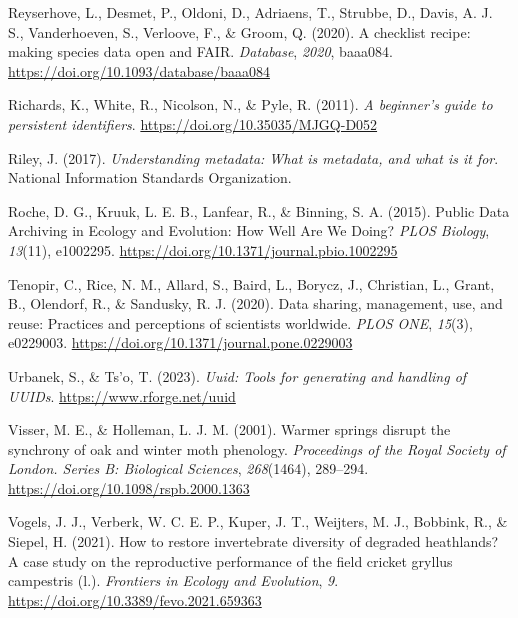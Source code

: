 \documentclass[
]{book}
\newlength{\cslhangindent}
\newlength{\cslentryspacingunit} %
\newenvironment{CSLReferences}[2] %
 {%
  \setlength{\parindent}{0pt}
  \ifodd #1
  \let\oldpar\par
  \def\par{\hangindent=\cslhangindent\oldpar}
  \fi
  \setlength{\parskip}{#2\cslentryspacingunit}
 }%
 {}
\begin{document}
\begin{CSLReferences}{1}{0}
\leavevmode{}%
Reyserhove, L., Desmet, P., Oldoni, D., Adriaens, T., Strubbe, D., Davis, A. J. S., Vanderhoeven, S., Verloove, F., \& Groom, Q. (2020). {A checklist recipe: making species data open and FAIR}. \emph{Database}, \emph{2020}, baaa084. \url{https://doi.org/10.1093/database/baaa084}

\leavevmode{}%
Richards, K., White, R., Nicolson, N., \& Pyle, R. (2011). \emph{A beginner's guide to persistent identifiers}. \url{https://doi.org/10.35035/MJGQ-D052}

\leavevmode{}%
Riley, J. (2017). \emph{Understanding metadata: What is metadata, and what is it for}. National Information Standards Organization.

\leavevmode{}%
Roche, D. G., Kruuk, L. E. B., Lanfear, R., \& Binning, S. A. (2015). Public {Data} {Archiving} in {Ecology} and {Evolution}: {How} {Well} {Are} {We} {Doing}? \emph{PLOS Biology}, \emph{13}(11), e1002295. \url{https://doi.org/10.1371/journal.pbio.1002295}

\leavevmode{}%
Tenopir, C., Rice, N. M., Allard, S., Baird, L., Borycz, J., Christian, L., Grant, B., Olendorf, R., \& Sandusky, R. J. (2020). Data sharing, management, use, and reuse: {Practices} and perceptions of scientists worldwide. \emph{PLOS ONE}, \emph{15}(3), e0229003. \url{https://doi.org/10.1371/journal.pone.0229003}

\leavevmode{}%
Urbanek, S., \& Ts'o, T. (2023). \emph{Uuid: Tools for generating and handling of UUIDs}. \url{https://www.rforge.net/uuid}

\leavevmode{}%
Visser, M. E., \& Holleman, L. J. M. (2001). Warmer springs disrupt the synchrony of oak and winter moth phenology. \emph{Proceedings of the Royal Society of London. Series B: Biological Sciences}, \emph{268}(1464), 289--294. \url{https://doi.org/10.1098/rspb.2000.1363}

\leavevmode{}%
Vogels, J. J., Verberk, W. C. E. P., Kuper, J. T., Weijters, M. J., Bobbink, R., \& Siepel, H. (2021). How to restore invertebrate diversity of degraded heathlands? A case study on the reproductive performance of the field cricket gryllus campestris (l.). \emph{Frontiers in Ecology and Evolution}, \emph{9}. \url{https://doi.org/10.3389/fevo.2021.659363}


\end{CSLReferences}
\end{document}
